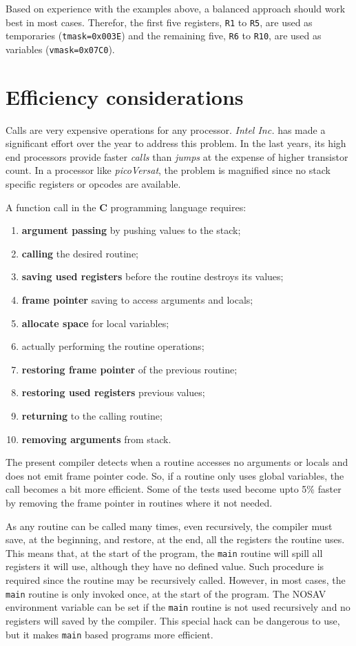 Based on experience with the examples above, a balanced approach should work best
in most cases.
Therefor, the first five registers, {\tt R1} to {\tt R5}, are used as temporaries
({\tt tmask=0x003E}) and the remaining five, {\tt R6} to {\tt R10}, are used as
variables ({\tt vmask=0x07C0}).

\section{Efficiency considerations}

Calls are very expensive operations for any processor.
{\it Intel Inc.} has made a significant effort over the year to address this
problem.
In the last years, its high end processors provide faster {\it calls} than
{\it jumps} at the expense of higher transistor count. %
In a processor like {\it picoVersat}, the problem is magnified since
no stack specific registers or opcodes are available.

A function call in the {\bf C} programming language requires:
\begin{enumerate} \itemsep0em 
\item {\bf argument passing} by pushing values to the stack;
\item {\bf calling} the desired routine;
\item {\bf saving used registers} before the routine destroys its values;
\item {\bf frame pointer} saving to access arguments and locals;
\item {\bf allocate space} for local variables;
\item actually performing the routine operations;
\item {\bf restoring frame pointer} of the previous routine;
\item {\bf restoring used registers} previous values;
\item {\bf returning} to the calling routine;
\item {\bf removing arguments} from stack.
\end{enumerate}
The present compiler detects when a routine accesses no arguments or locals
and does not emit frame pointer code. So, if a routine only uses global
variables, the call becomes a bit more efficient.
Some of the tests used become upto 5\% faster by removing the frame
pointer in routines where it not needed.

As any routine can be called many times, even recursively, the compiler
must save, at the beginning, and restore, at the end,
all the registers the routine uses.
This means that, at the start of the program, the {\tt main} routine will spill
all registers it will use, although they have no defined value.
Such procedure is required since the routine may be recursively called.
However, in most cases, the {\tt main} routine is only invoked once, at
the start of the program.
The {\sc NOSAV} environment variable can be set if the {\tt main}
routine is not used recursively and no registers will saved by the compiler.
This special hack can be dangerous to use, but it makes {\tt main} based
programs more efficient.


